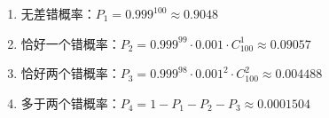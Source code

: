 \begin{solution}
   \begin{enumerate}
        \item 无差错概率：$P_1 = 0.999^{100} \approx 0.9048$
        \item 恰好一个错概率：$P_2 = 0.999^{99}\cdot 0.001\cdot C_{100}^1 \approx 0.09057$
        \item 恰好两个错概率：$P_3 = 0.999^{98}\cdot 0.001^{2}\cdot C_{100}^2 \approx 0.004488$
        \item 多于两个错概率：$P_4 = 1 - P_1 - P_2 -  P_3 \approx 0.0001504$
   \end{enumerate}
\end{solution}